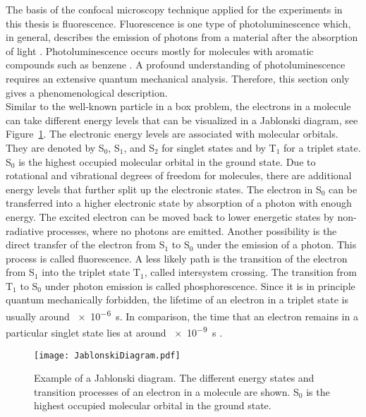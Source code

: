 The basis of the confocal microscopy technique applied for the experiments in this thesis is fluorescence. Fluorescence is one type of photoluminescence which, in general, describes the emission of photons from a material after the absorption of light \cite{Lakowicz2006}. Photoluminescence occurs mostly for molecules with aromatic compounds such as benzene \cite{Li1972}. A profound understanding of photoluminescence requires an extensive quantum mechanical analysis. Therefore, this section only gives a phenomenological description.\\

Similar to the well-known particle in a box problem, the electrons in a molecule can take different energy levels that can be visualized in a Jablonski diagram, see Figure~\ref{fig:JablonskiDiagram}. The electronic energy levels are associated with molecular orbitals. They are denoted by S$_0$, S$_1$, and S$_2$ for singlet states and by T$_1$ for a triplet state. S$_0$ is the highest occupied molecular orbital in the ground state. Due to rotational and vibrational degrees of freedom for molecules, there are additional energy levels that further split up the electronic states. The electron in S$_0$ can be transferred into a higher electronic state by absorption of a photon with enough energy. The excited electron can be moved back to lower energetic states by non-radiative processes, where no photons are emitted. Another possibility is the direct transfer of the electron from S$_1$ to S$_0$ under the emission of a photon. This process is called fluorescence. A less likely path is the transition of the electron from S$_1$ into the triplet state T$_1$, called intersystem crossing. The transition from T$_1$ to S$_0$ under photon emission is called phosphorescence. Since it is in principle quantum mechanically forbidden, the lifetime of an electron in a triplet state is usually around \SI{e-6}{\second}. In comparison, the time that an electron remains in a particular singlet state lies at around \SI{e-9}{\second} \cite{Lichtman2005}.\\

\begin{figure}[h!]
	\centering
	\texttt{[image: JablonskiDiagram.pdf]}
	\caption[Example of a Jablonski diagram]{Example of a Jablonski diagram. The different energy states and transition processes of an electron in a molecule are shown. S$_0$ is the highest occupied molecular orbital in the ground state.}
	\label{fig:JablonskiDiagram}
\end{figure}

